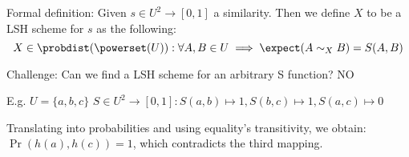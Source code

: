 	
	
	Formal definition: Given $s \in U^2 \to [0,1]$ a similarity. Then we define $X$ to be a LSH scheme for $s$ as the following:
	\begin{equation}
	X \in \probdist(\powerset(U)) : \forall A, B \in U \implies \expect(A\sim_X B) = S(A, B)
	\end{equation}
	
	Challenge: Can we find a LSH scheme for an arbitrary S function? NO
	
	E.g. $U = \{a, b, c\}$
	$S \in U^2 \rightarrow [0, 1] : S(a, b) \mapsto 1, S(b, c) \mapsto 1, S(a, c) \mapsto 0$ %
	
	Translating into probabilities and using equality's transitivity, we obtain: $\Pr(h(a), h(c))=1$, which contradicts the third mapping.